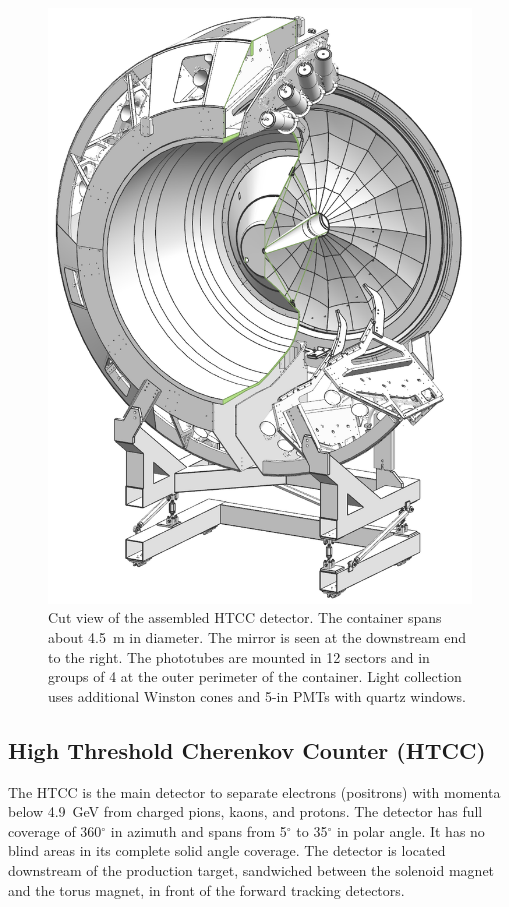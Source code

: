 \documentclass[final,3p,twocolumn]{elsarticle}
\begin{document}
\begin{figure}[htbp!]
\centerline{\includegraphics[width=0.9\columnwidth]{htcc-view-3.png}}
\caption{Cut view of the assembled HTCC detector. The container spans about 4.5~m in diameter. The mirror is
seen at the downstream end to the right. The phototubes are mounted in 12 sectors and in groups of 4 at the outer
perimeter of the container. Light collection uses additional Winston cones and 5-in PMTs with quartz windows.}
\label{HTCC-container}
\end{figure}

\subsection{High Threshold Cherenkov Counter (HTCC)}

The HTCC is the main detector to separate electrons (positrons) with momenta below 4.9~GeV from charged pions,
kaons, and protons. The detector has full coverage of 360$^\circ$ in azimuth and spans from 5$^\circ$ to 35$^\circ$
in polar angle. It has no blind areas in its complete solid angle coverage. The detector is located downstream of the
production target, sandwiched between the solenoid magnet and the torus magnet, in front of the forward tracking
detectors. 
\end{document}
